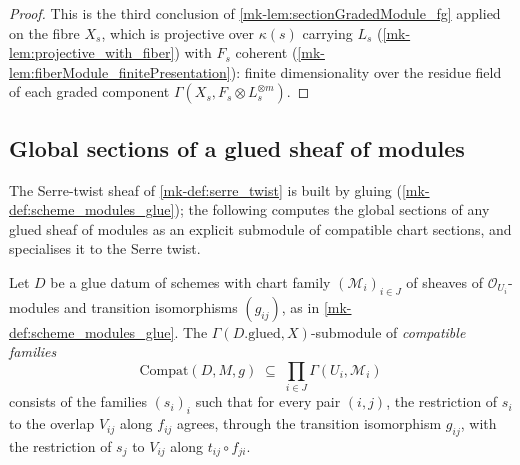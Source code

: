\begin{proof}
  This is the third conclusion of \ref{mk-lem:sectionGradedModule_fg} applied on
  the fibre \(X_s\), which is projective over \(\kappa(s)\) carrying \(L_s\)
  (\ref{mk-lem:projective_with_fiber}) with \(F_s\) coherent
  (\ref{mk-lem:fiberModule_finitePresentation}): finite dimensionality over the
  residue field of each graded component
  \(\Gamma(X_s, F_s \otimes L_s^{\otimes m})\).
\end{proof}

\subsection{Global sections of a glued sheaf of modules}
\label{mk-subsec:glue_gamma_compatible}

The Serre-twist sheaf of \ref{mk-def:serre_twist} is built by gluing
(\ref{mk-def:scheme_modules_glue}); the following computes the global sections
of any glued sheaf of modules as an explicit submodule of compatible chart
sections, and specialises it to the Serre twist.

\begin{definition}
  \label{mk-def:glue_gamma_compatible}
  \leanok
  Let \(D\) be a glue datum of schemes with chart family
  \((\mathcal M_i)_{i \in J}\) of sheaves of \(\mathcal O_{U_i}\)-modules and
  transition isomorphisms \((g_{ij})\), as in \ref{mk-def:scheme_modules_glue}.
  The \(\Gamma(D.\mathrm{glued}, X)\)-submodule of \emph{compatible families}
  \[
    \mathrm{Compat}(D, M, g) \;\subseteq\; \prod_{i \in J} \Gamma(U_i, \mathcal M_i)
  \]
  consists of the families \((s_i)_i\) such that for every pair \((i,j)\),
  the restriction of \(s_i\) to the overlap \(V_{ij}\) along \(f_{ij}\)
  agrees, through the transition isomorphism \(g_{ij}\), with the
  restriction of \(s_j\) to \(V_{ij}\) along \(t_{ij} \circ f_{ji}\).
\end{definition}

